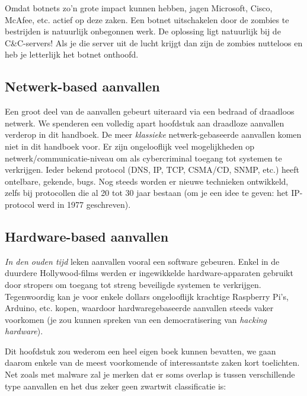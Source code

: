 \documentclass[
  10pt,
  dutch,
  paper=a4,
  ,captions=tableheading
]{scrbook}
\begin{document}
Omdat botnets zo'n grote impact kunnen hebben, jagen Microsoft, Cisco,
McAfee, etc. actief op deze zaken. Een botnet uitschakelen door de
zombies te bestrijden is natuurlijk onbegonnen werk. De oplossing ligt
natuurlijk bij de C\&C-servers! Als je die server uit de lucht krijgt
dan zijn de zombies nutteloos en heb je letterlijk het botnet onthoofd.

\subsection{Netwerk-based aanvallen}\label{netwerk-based-aanvallen}

Een groot deel van de aanvallen gebeurt uiteraard via een bedraad of
draadloos netwerk. We spenderen een volledig apart hoofdstuk aan
draadloze aanvallen verderop in dit handboek. De meer \emph{klassieke}
netwerk-gebaseerde aanvallen komen niet in dit handboek voor. Er zijn
ongelooflijk veel mogelijkheden op netwerk/communicatie-niveau om als
cybercriminal toegang tot systemen te verkrijgen. Ieder bekend protocol
(DNS, IP, TCP, CSMA/CD, SNMP, etc.) heeft ontelbare, gekende, bugs. Nog
steeds worden er nieuwe technieken ontwikkeld, zelfs bij protocollen die
al 20 tot 30 jaar bestaan (om je een idee te geven: het IP-protocol werd
in 1977 geschreven).

\subsection{Hardware-based aanvallen}\label{hardware-based-aanvallen}

\emph{In den ouden tijd} leken aanvallen vooral een software gebeuren.
Enkel in de duurdere Hollywood-films werden er ingewikkelde
hardware-apparaten gebruikt door stropers om toegang tot streng
beveiligde systemen te verkrijgen. Tegenwoordig kan je voor enkele
dollars ongelooflijk krachtige Raspberry Pi's, Arduino, etc. kopen,
waardoor hardwaregebaseerde aanvallen steeds vaker voorkomen (je zou
kunnen spreken van een democratisering van \emph{hacking hardware}).

Dit hoofdstuk zou wederom een heel eigen boek kunnen bevatten, we gaan
daarom enkele van de meest voorkomende of interessantste zaken kort
toelichten. Net zoals met malware zal je merken dat er soms overlap is
tussen verschillende type aanvallen en het dus zeker geen zwartwit
classificatie is:
\end{document}
